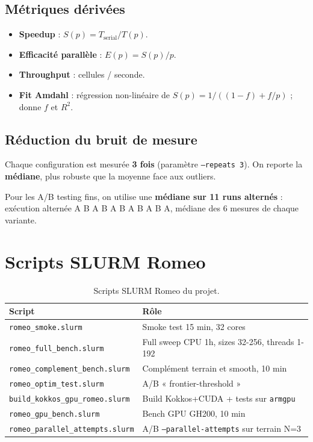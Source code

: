 \subsection{Métriques dérivées}

\begin{itemize}
    \item \textbf{Speedup} : $S(p) = T_{\text{serial}} / T(p)$.
    \item \textbf{Efficacité parallèle} : $E(p) = S(p) / p$.
    \item \textbf{Throughput} : cellules / seconde.
    \item \textbf{Fit Amdahl} : régression non-linéaire de $S(p) = 1 / ((1-f) + f/p)$ ; donne $f$ et $R^2$.
\end{itemize}

\subsection{Réduction du bruit de mesure}

Chaque configuration est mesurée \textbf{3 fois} (paramètre \texttt{--repeats 3}). On reporte la \textbf{médiane}, plus robuste que la moyenne face aux outliers.

Pour les A/B testing fins, on utilise une \textbf{médiane sur 11 runs alternés} : exécution alternée A B A B A B A B A B A, médiane des 6 mesures de chaque variante.

\section{Scripts SLURM Romeo}
\label{sec:proto:slurm}

\begin{table}[H]
\centering
\begin{tabularx}{\textwidth}{lX}
\toprule
\textbf{Script} & \textbf{Rôle} \\
\midrule
\texttt{romeo\_smoke.slurm} & Smoke test 15 min, 32 cores \\
\texttt{romeo\_full\_bench.slurm} & Full sweep CPU 1h, sizes 32-256, threads 1-192 \\
\texttt{romeo\_complement\_bench.slurm} & Complément terrain et smooth, 10 min \\
\texttt{romeo\_optim\_test.slurm} & A/B « frontier-threshold » \\
\texttt{build\_kokkos\_gpu\_romeo.slurm} & Build Kokkos+CUDA + tests sur \texttt{armgpu} \\
\texttt{romeo\_gpu\_bench.slurm} & Bench GPU GH200, 10 min \\
\texttt{romeo\_parallel\_attempts.slurm} & A/B \texttt{--parallel-attempts} sur terrain N=3 \\
\bottomrule
\end{tabularx}
\caption{Scripts SLURM Romeo du projet.}
\label{tab:proto:slurm}
\end{table}

